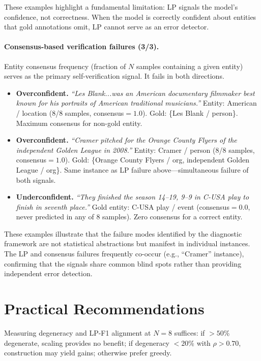 \noindent These examples highlight a fundamental limitation: LP signals the model's confidence, not correctness. When the model is correctly confident about entities that gold annotations omit, LP cannot serve as an error detector.

\paragraph{Consensus-based verification failures (3/3).}
Entity consensus frequency (fraction of $N$ samples containing a given entity) serves as the primary self-verification signal. It fails in both directions.

\begin{itemize}[nosep,leftmargin=*]
\item \textbf{Overconfident.} \textit{``Les Blank...was an American documentary filmmaker best known for his portraits of American traditional musicians.''} Entity: American / location (8/8 samples, consensus${=}1.0$). Gold: \{Les Blank / person\}. Maximum consensus for non-gold entity.

\item \textbf{Overconfident.} \textit{``Cramer pitched for the Orange County Flyers of the independent Golden League in 2008.''} Entity: Cramer / person (8/8 samples, consensus${=}1.0$). Gold: \{Orange County Flyers / org, independent Golden League / org\}. Same instance as LP failure above---simultaneous failure of both signals.

\item \textbf{Underconfident.} \textit{``They finished the season 14--19, 9--9 in C-USA play to finish in seventh place.''} Gold entity: C-USA play / event (consensus${=}0.0$, never predicted in any of 8 samples). Zero consensus for a correct entity.
\end{itemize}

\noindent These examples illustrate that the failure modes identified by the diagnostic framework are not statistical abstractions but manifest in individual instances. The LP and consensus failures frequently co-occur (e.g., ``Cramer'' instance), confirming that the signals share common blind spots rather than providing independent error detection.

\section{Practical Recommendations}\label{app:recommendations}

Measuring degeneracy and LP-F1 alignment at $N{=}8$ suffices: if ${>}50$\% degenerate, scaling provides no benefit; if degeneracy ${<}20$\% with $\rho{>}0.70$, construction may yield gains; otherwise prefer greedy.

